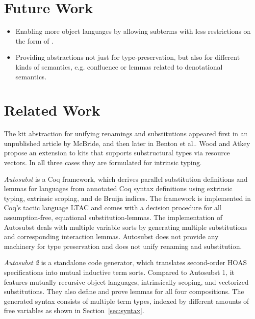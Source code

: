 \documentclass[sigplan,10pt, anonymous]{acmart}
\newcommand*\ACode[1]{\AgdaFontStyle{\textcolor{mygray}{#1}}}
\begin{document}
  \section{Future Work}
  \label{sec:future}
  \begin{itemize}
  \item
    Enabling more object languages by allowing subterms with less
    restrictions on the form of \ACode{S}.
  \item
    Providing abstractions not just for type-preservation, but also
    for different kinds of semantics, e.g. confluence or lemmas related
    to denotational semantics.
  \end{itemize}

  \section{Related Work}
  \label{sec:related}

  The kit abstraction for unifying renamings and substitutions
  appeared first in an unpublished article by
  McBride\cite{unpublished:mcbride2005kits}, and then later in
  Benton et al.\cite{DBLP:journals/jar/BentonHKM12}. 
  Wood and Atkey\cite{DBLP:journals/corr/abs-2005-02247} propose an
  extension to kits that supports substructural types via resource
  vectors.
  In all three cases they are formulated for intrinsic typing.

  \emph{Autosubst}\cite{DBLP:conf/itp/SchaferTS15}
  is a Coq framework, which derives parallel substitution definitions and
  lemmas for languages from annotated Coq syntax definitions using
  extrinsic typing, extrinsic scoping, and de Bruijn indices.
  The framework is implemented in Coq's tactic language LTAC and comes
  with a decision procedure for all assumption-free, equational
  substitution-lemmas.
  The implementation of Autosubst deals with multiple variable sorts
  by generating multiple substitutions and corresponding interaction lemmas.
  Autosubst does not provide any machinery for type preservation and
  does not unify renaming and substitution.

  \emph{Autosubst 2}\cite{DBLP:conf/cpp/StarkSK19} is a standalone
  code generator, which translates second-order HOAS specifications into
  mutual inductive term sorts. Compared to Autosubst 1, it features
  mutually recursive object languages, intrinsically scoping, and
  vectorized substitutions.
  They also define and prove lemmas for all four compositions.
  The generated syntax consists of multiple term types, indexed by
  different amounts of free variables as shown in Section~\ref{sec:syntax}.
\end{document}
